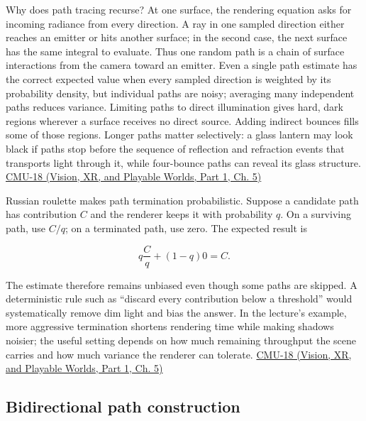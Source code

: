 Why does path tracing recurse? At one surface, the rendering equation asks for incoming radiance from every direction. A ray in one sampled direction either reaches an emitter or hits another surface; in the second case, the next surface has the same integral to evaluate. Thus one random path is a chain of surface interactions from the camera toward an emitter. Even a single path estimate has the correct expected value when every sampled direction is weighted by its probability density, but individual paths are noisy; averaging many independent paths reduces variance. Limiting paths to direct illumination gives hard, dark regions wherever a surface receives no direct source. Adding indirect bounces fills some of those regions. Longer paths matter selectively: a glass lantern may look black if paths stop before the sequence of reflection and refraction events that transports light through it, while four-bounce paths can reveal its glass structure. \href{../07-Vision-XR-and-Playable-Worlds-P01/main.pdf\#04-visual-computing-ii-ch036-cmu-18---monte-carlo-rendering}{CMU-18 (Vision, XR, and Playable Worlds, Part 1, Ch. 5)}

Russian roulette makes path termination probabilistic. Suppose a candidate path has contribution \(C\) and the renderer keeps it with probability \(q\). On a surviving path, use \(C/q\); on a terminated path, use zero. The expected result is

\[
q\frac{C}{q}+(1-q)0=C.
\]

The estimate therefore remains unbiased even though some paths are skipped. A deterministic rule such as ``discard every contribution below a threshold'' would systematically remove dim light and bias the answer. In the lecture's example, more aggressive termination shortens rendering time while making shadows noisier; the useful setting depends on how much remaining throughput the scene carries and how much variance the renderer can tolerate. \href{../07-Vision-XR-and-Playable-Worlds-P01/main.pdf\#04-visual-computing-ii-ch036-cmu-18---monte-carlo-rendering}{CMU-18 (Vision, XR, and Playable Worlds, Part 1, Ch. 5)}

\subsection{Bidirectional path construction}\label{03-visual-computing-i-ch011-bidirectional-path-construction}

\hypertarget{03-visual-computing-i-ch011-bidirectional-path-construction}{}

